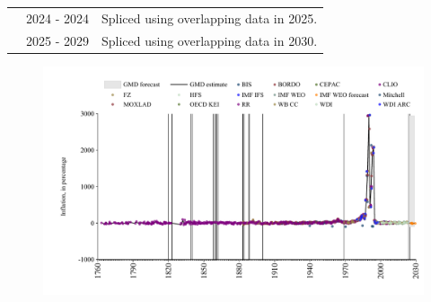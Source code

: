 \documentclass[12pt,a4paper,landscape]{article}
\begin{document}
\begin{adjustbox}{max totalsize={\paperwidth}{\paperheight},center}
\begin{minipage}[t][\textheight][t]{\textwidth}
\begin{table}[H]
\begin{tabular}{|l|l|l|}
\rowcolor{lightgray}\cite{BIS}& 2024 - 2024 &Spliced using overlapping data in 2025. \\
\rowcolor{white}\cite{IMF_WEO_forecast}& 2025 - 2029 &Spliced using overlapping data in 2030. \\
\hline
\end{tabular}
\end{table}
\begin{figure}[H]
\centering
\includegraphics[width=\textwidth,height=0.6\textheight,keepaspectratio]{graphs/BRA_infl.pdf}
\end{figure}
\end{minipage}
\end{adjustbox}
\end{document}
